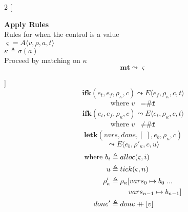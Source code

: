 \documentclass[12pt,draft]{article}
\newcommand\mdoubleplus{\ensuremath{\mathbin{+\mkern-9mu+}}}
\newcommand{\falsesyn}{\texttt{\#f}}
\begin{document}
\newpage


\begin{multicols*}{2}
[
\begin{center}
\textbf{Apply Rules} \\
Rules for when the control is a value \\
$\varsigma = A\langle v , \rho , a , t \rangle$ \\
$\kappa \triangleq \sigma(a)$ \\
Proceed by matching on $\kappa$
\[
\textbf{mt} \leadsto \varsigma
\]
\end{center}
\vspace{-15mm}
]
\[
\textbf{ifk}(e_t, e_f, \rho_\kappa, c)
\leadsto
E\langle
e_f , \rho_\kappa , c , t
\rangle
\]
\vspace{-13mm}
\begin{align*}
\text{where } v &= \falsesyn
\end{align*}
\[
\textbf{ifk}(e_t, e_f, \rho_\kappa, c)
\leadsto
E\langle
e_t , \rho_\kappa , c , t
\rangle
\]
\vspace{-11mm}
\begin{align*}
\text{where } v &\not= \falsesyn
\end{align*}
\[
\textbf{letk}(vars, done, [\;], e_b , \rho_{\kappa}, c)
\]
\vspace{-7mm}
\[
\leadsto
E\langle
e_b , \rho'_{\kappa} , c , u
\rangle
\]
\vspace{-10mm}
\begin{align*}
\text{where } b_i &\triangleq alloc(\varsigma, i) \\
u &\triangleq tick(\varsigma, n) \\
\rho'_{\kappa} &\triangleq \rho_{\kappa}[vars_0 \mapsto b_0\;...\\
&\;\;\;\;\;\;\;\;\;  vars_{n-1} \mapsto b_{n-1}] \\
  done' &\triangleq done \mdoubleplus [v] \\

\end{align*}
\end{multicols*}
\end{document}
